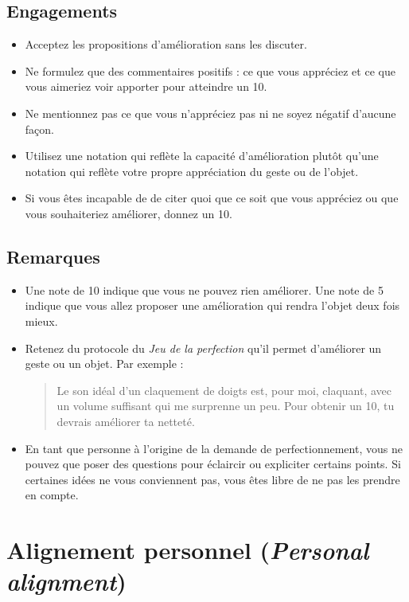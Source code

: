 \documentclass[11pt]{book}
\let\oldsection\section
\renewcommand\section{\clearpage\oldsection}
\begin{document}
\subsection{Engagements}
\begin{itemize}
	\item Acceptez les propositions d'amélioration sans les discuter.
	\item Ne formulez que des commentaires positifs : ce que vous appréciez et ce que vous aimeriez voir apporter pour atteindre un 10.
	\item Ne mentionnez pas ce que vous n'appréciez pas ni ne soyez négatif d'aucune façon.
	\item Utilisez une notation qui reflète la capacité d'amélioration plutôt qu'une notation qui reflète votre propre appréciation du geste ou de l'objet.
	\item Si vous êtes incapable de de citer quoi que ce soit que vous appréciez ou que vous souhaiteriez améliorer, donnez un 10.
\end{itemize}

\subsection{Remarques}
\begin{itemize}
	\item Une note de 10 indique que vous ne pouvez rien améliorer. Une note de 5 indique que vous allez proposer une amélioration qui rendra l'objet deux fois mieux.
	\item Retenez du protocole du \emph{Jeu de la perfection} qu'il permet d'améliorer un geste ou un objet. Par exemple :
	      \begin{quote}
	      	\og{}Le son idéal d'un claquement de doigts est, pour moi, claquant, avec un volume suffisant qui me surprenne un peu. Pour obtenir un 10, tu devrais
	        améliorer ta netteté.\fg{}
	      \end{quote}
	\item En tant que personne à l'origine de la demande de perfectionnement, vous ne pouvez que poser des questions pour éclaircir ou expliciter certains points.
	      Si certaines idées ne vous conviennent pas, vous êtes libre de ne pas les prendre en compte.
\end{itemize}

\section{Alignement personnel (\emph{Personal alignment})} \label{protocole-alignement-personnel}
\end{document}
